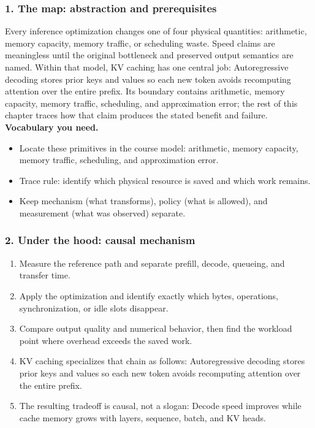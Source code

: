 \subsubsection*{1. The map: abstraction and prerequisites}
Every inference optimization changes one of four physical quantities: arithmetic, memory capacity, memory traffic, or scheduling waste. Speed claims are meaningless until the original bottleneck and preserved output semantics are named.
Within that model, KV caching has one central job: Autoregressive decoding stores prior keys and values so each new token avoids recomputing attention over the entire prefix. Its boundary contains arithmetic, memory capacity, memory traffic, scheduling, and approximation error; the rest of this chapter traces how that claim produces the stated benefit and failure.
\textbf{Vocabulary you need.}\begin{itemize}
\item Locate these primitives in the course model: arithmetic, memory capacity, memory traffic, scheduling, and approximation error.
\item Trace rule: identify which physical resource is saved and which work remains.
\item Keep mechanism (what transforms), policy (what is allowed), and measurement (what was observed) separate.
\end{itemize}
\subsubsection*{2. Under the hood: causal mechanism}\begin{enumerate}
\item Measure the reference path and separate prefill, decode, queueing, and transfer time.
\item Apply the optimization and identify exactly which bytes, operations, synchronization, or idle slots disappear.
\item Compare output quality and numerical behavior, then find the workload point where overhead exceeds the saved work.
\item KV caching specializes that chain as follows: Autoregressive decoding stores prior keys and values so each new token avoids recomputing attention over the entire prefix.
\item The resulting tradeoff is causal, not a slogan: Decode speed improves while cache memory grows with layers, sequence, batch, and KV heads.
\end{enumerate}
